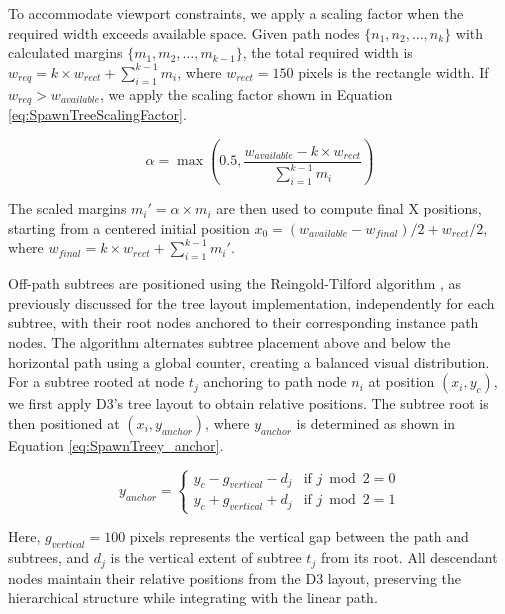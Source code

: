 To accommodate viewport constraints, we apply a scaling factor when the required width exceeds available space. Given path nodes $\{n_1, n_2, \ldots, n_k\}$ with calculated margins $\{m_1, m_2, \ldots, m_{k-1}\}$, the total required width is $w_{req} = k \times w_{rect} + \sum_{i=1}^{k-1} m_i$, where $w_{rect} = 150$ pixels is the rectangle width. If $w_{req} > w_{available}$, we apply the scaling factor shown in Equation \ref{eq:SpawnTreeScalingFactor}.

\begin{equation}
\alpha = \max\left(0.5, \frac{w_{available} - k \times w_{rect}}{\sum_{i=1}^{k-1} m_i}\right)
\label{eq:SpawnTreeScalingFactor}
\end{equation}

The scaled margins $m_i' = \alpha \times m_i$ are then used to compute final X positions, starting from a centered initial position $x_0 = (w_{available} - w_{final})/2 + w_{rect}/2$, where $w_{final} = k \times w_{rect} + \sum_{i=1}^{k-1} m_i'$.

Off-path subtrees are positioned using the Reingold-Tilford algorithm \cite{1702828}, as previously discussed for the tree layout implementation, independently for each subtree, with their root nodes anchored to their corresponding instance path nodes. The algorithm alternates subtree placement above and below the horizontal path using a global counter, creating a balanced visual distribution. For a subtree rooted at node $t_j$ anchoring to path node $n_i$ at position $(x_i, y_c)$, we first apply D3's tree layout to obtain relative positions. The subtree root is then positioned at $(x_i, y_{anchor})$, where $y_{anchor}$ is determined as shown in Equation \ref{eq:SpawnTreey_anchor}.

\begin{equation}
y_{anchor} = \begin{cases}
y_c - g_{vertical} - d_j & \text{if } j \bmod 2 = 0 \\
y_c + g_{vertical} + d_j & \text{if } j \bmod 2 = 1
\end{cases}
\label{eq:SpawnTreey_anchor}
\end{equation}

Here, $g_{vertical} = 100$ pixels represents the vertical gap between the path and subtrees, and $d_j$ is the vertical extent of subtree $t_j$ from its root. All descendant nodes maintain their relative positions from the D3 layout, preserving the hierarchical structure while integrating with the linear path.

